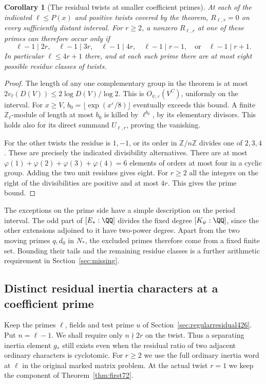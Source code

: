 \documentclass[a4paper,11pt]{article}
\newtheorem{corollary}[proposition]{Corollary}
\theoremstyle{definition}
\theoremstyle{remark}
\newcommand{\ZZ}{\mathbb Z}\newcommand{\ord}{\operatorname{ord}}
\numberwithin{equation}{section}
\begin{document}
\begin{corollary}[The residual twists at smaller coefficient primes]\leavevmode
\label{cor:remainingresidues426}
At each of the indicated \(\ell\le P(x)\) and positive twists
covered by the theorem, \(R_{\ell,r}=0\) on every sufficiently
distant interval. For \(r\ge2\), a nonzero \(R_{\ell,r}\) at
one of these primes can therefore occur only if
\[
     \ell-1\mid 2r,\quad \ell-1\mid 3r,\quad
     \ell-1\mid 4r,\quad \ell-1\mid r-1,\quad
     \text{or}\quad \ell-1\mid r+1.
\]
In particular \(\ell\le4r+1\) there, and at each such prime
there are at most eight possible residue classes of twists.
\end{corollary}
\begin{proof}
The length of any one complementary group in the theorem
is at most \(2v_\ell(D(V))\le 2\log D(V)/\log 2\).
This is \(O_{\psi,\varepsilon}(V^C)\), uniformly on the
interval. For \(x\ge V\), \(b_0=\lfloor\exp(x^\varepsilon/8)\rfloor\)
eventually exceeds this bound. A finite \(\ZZ_\ell\)-module
of length at most \(b_0\) is killed by \(\ell^{b_0}\), by
its elementary divisors. This holds also for its direct
summand \(U_{\ell,r}\), proving the vanishing.

For the other twists the residue is \(1,-1\), or its
order in \(\ZZ/n\ZZ\) divides one of \(2,3,4\).
These are precisely the indicated divisibility alternatives.
There are at most
\(\varphi(1)+\varphi(2)+\varphi(3)+\varphi(4)=6\)
elements of orders at most four in a cyclic group. Adding
the two unit residues gives eight. For \(r\ge2\) all the
integers on the right of the divisibilities are positive
and at most \(4r\). This gives the prime bound.
\end{proof}

The exceptions on the prime side have a simple description
on the period interval. The odd part of \([E_*:\QQ]\) divides
the fixed degree \([K_\psi:\QQ]\), since the other extensions
adjoined to it have two-power degree. Apart from the two
moving primes \(q,d_0\) in \(N_*\), the excluded primes
therefore come from a fixed finite set. Bounding their tails
and the remaining residue classes is a further arithmetic
requirement in Section~\ref{sec:missing}.


\subsection{Distinct residual inertia characters at a coefficient prime}
\label{sec:ordinaryobstructions427}

Keep the primes \(\ell\), fields and test prime \(u\) of
Section~\ref{sec:regularresidual426}. Put \(n=\ell-1\). We shall
require only \(n\nmid 2r\) on the twist. Thus a separating
inertia element \(g_*\) still exists even when the residual
ratio of two adjacent ordinary characters is cyclotomic.
For \(r\ge2\) we use the full ordinary inertia word at \(\ell\)
in the original marked matrix problem. At the actual twist
\(r=1\) we keep the component of Theorem~\ref{thm:first72}.
\end{document}
